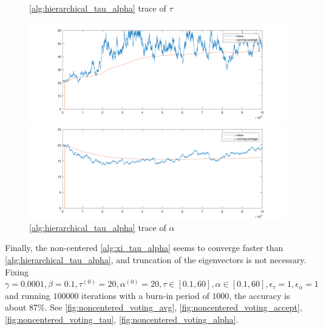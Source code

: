 \documentclass{siamart1116}
\begin{document}
    \begin{figure}[!htb]
    \begin{minipage}{0.48\textwidth}
        \caption{\label{fig:centered_voting_tau} \cref{alg:hierarchical_tau_alpha} trace of $\tau$}
        \includegraphics[width=\linewidth]{voting/centered/trace_tau.png}
    \end{minipage}\hfill
    \begin{minipage}{0.48\textwidth}
        \caption{\label{fig:centered_voting_alpha} \cref{alg:hierarchical_tau_alpha} trace of $\alpha$}
        \includegraphics[width=\linewidth]{voting/centered/trace_alpha.png}
    \end{minipage}

    \end{figure}

    Finally, the non-centered \cref{alg:xi_tau_alpha} seems to converge faster than \cref{alg:hierarchical_tau_alpha}, and truncation of the eigenvectors is not necessary. Fixing $\gamma = 0.0001, \beta = 0.1, \tau^{(0)}=20,\alpha^{(0)}=20,\tau\in[0.1,60],\alpha\in[0.1,60],\epsilon_\tau=1,\epsilon_\alpha=1$ and running $100000$ iterations with a burn-in period of $1000$, the accuracy is about 87\%.  See \cref{fig:noncentered_voting_avg}, \cref{fig:noncentered_voting_accept}, \cref{fig:noncentered_voting_tau}, \cref{fig:noncentered_voting_alpha}.
\end{document}

